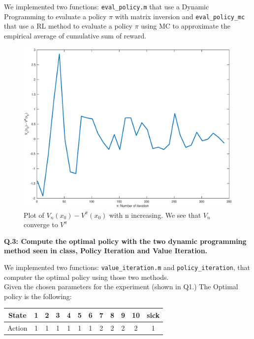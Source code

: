 \documentclass[a4paper,11pt]{exam}
\begin{document}
We implemented two functions: \verb|eval_policy.m| that use a Dynamic Programming to evaluate a policy $\pi$ with matrix inversion and \verb|eval_policy_mc| that use a RL method to evaluate a policy $\pi$ using MC to approximate the empirical average of cumulative sum of reward.


\begin{figure}[!h]
\centering
\includegraphics[width=13cm]{figures/Vn-Vpi.eps}
\caption{Plot of $V_{n}(x_{0}) - V^{\pi}(x_{0})$ with n increasing. We see that $V_{n}$ converge to $V^{\pi}$}    
\label{Vn-Vpi}
\end{figure}


\textbf{Q.3: Compute the optimal policy with the two dynamic programming method seen in class, Policy Iteration and Value Iteration.\\}

We implemented two functions: \verb|value_iteration.m| and \verb|policy_iteration|, that computer the optimal policy using those two methods. \\
Given the chosen parameters for the experiment (shown in Q1.) The Optimal policy is the following:

\begin{center}
	\begin{tabular}{ c | c | c  | c  | c  | c  | c  | c  | c  | c | c | c}
		 State & 1 & 2 & 3 & 4 & 5 & 6 & 7 & 8 & 9 & 10 & sick \\
		 \hline
		 Action & 1 & 1 & 1 & 1 & 1 & 1 &  2 & 2 & 2 & 2 & 1 \\
 	\end{tabular}
\end{center}
\end{document}
